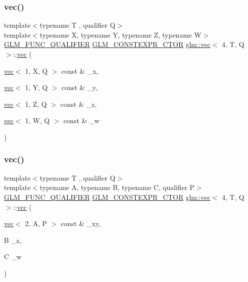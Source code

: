 \subsubsection{\texorpdfstring{vec()}{vec()}\hspace{0.1cm}{\footnotesize\ttfamily [22/34]}}
{\footnotesize\ttfamily template$<$typename T , qualifier Q$>$ \\
template$<$typename X, typename Y, typename Z, typename W$>$ \\
\mbox{\hyperlink{setup_8hpp_a33fdea6f91c5f834105f7415e2a64407}{G\+L\+M\+\_\+\+F\+U\+N\+C\+\_\+\+Q\+U\+A\+L\+I\+F\+I\+ER}} \mbox{\hyperlink{setup_8hpp_ad34178a09666081abdb573c14d1f4a5a}{G\+L\+M\+\_\+\+C\+O\+N\+S\+T\+E\+X\+P\+R\+\_\+\+C\+T\+OR}} \mbox{\hyperlink{structglm_1_1vec}{glm\+::vec}}$<$ 4, T, Q $>$\+::\mbox{\hyperlink{structglm_1_1vec}{vec}} (\begin{DoxyParamCaption}\item[{\mbox{\hyperlink{structglm_1_1vec}{vec}}$<$ 1, X, Q $>$ const \&}]{\+\_\+x,  }\item[{\mbox{\hyperlink{structglm_1_1vec}{vec}}$<$ 1, Y, Q $>$ const \&}]{\+\_\+y,  }\item[{\mbox{\hyperlink{structglm_1_1vec}{vec}}$<$ 1, Z, Q $>$ const \&}]{\+\_\+z,  }\item[{\mbox{\hyperlink{structglm_1_1vec}{vec}}$<$ 1, W, Q $>$ const \&}]{\+\_\+w }\end{DoxyParamCaption})}

\mbox{\label{structglm_1_1vec_3_014_00_01_t_00_01_q_01_4_a1624a51ea4a5641d8d6a49dc499fcae9}} 
\subsubsection{\texorpdfstring{vec()}{vec()}\hspace{0.1cm}{\footnotesize\ttfamily [23/34]}}
{\footnotesize\ttfamily template$<$typename T , qualifier Q$>$ \\
template$<$typename A, typename B, typename C, qualifier P$>$ \\
\mbox{\hyperlink{setup_8hpp_a33fdea6f91c5f834105f7415e2a64407}{G\+L\+M\+\_\+\+F\+U\+N\+C\+\_\+\+Q\+U\+A\+L\+I\+F\+I\+ER}} \mbox{\hyperlink{setup_8hpp_ad34178a09666081abdb573c14d1f4a5a}{G\+L\+M\+\_\+\+C\+O\+N\+S\+T\+E\+X\+P\+R\+\_\+\+C\+T\+OR}} \mbox{\hyperlink{structglm_1_1vec}{glm\+::vec}}$<$ 4, T, Q $>$\+::\mbox{\hyperlink{structglm_1_1vec}{vec}} (\begin{DoxyParamCaption}\item[{\mbox{\hyperlink{structglm_1_1vec}{vec}}$<$ 2, A, P $>$ const \&}]{\+\_\+xy,  }\item[{B}]{\+\_\+z,  }\item[{C}]{\+\_\+w }\end{DoxyParamCaption})}

